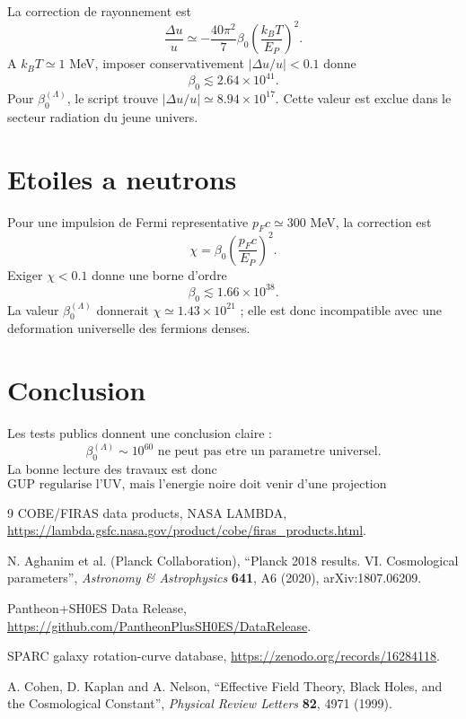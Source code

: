 \documentclass[11pt,a4paper]{article}
\begin{document}
La correction de rayonnement est
\begin{equation}
\frac{\Delta u}{u}
\simeq
-\frac{40\pi^2}{7}\beta_0\left(\frac{k_BT}{E_P}\right)^2.
\end{equation}
A $k_BT\simeq1$ MeV, imposer conservativement
$|\Delta u/u|<0.1$ donne
\begin{equation}
\beta_0\lesssim 2.64\times10^{41}.
\end{equation}
Pour $\beta_0^{(\Lambda)}$, le script trouve
$|\Delta u/u|\simeq8.94\times10^{17}$. Cette valeur est exclue dans le secteur
radiation du jeune univers.

\section{Etoiles a neutrons}

Pour une impulsion de Fermi representative $p_Fc\simeq300$ MeV, la correction
est
\begin{equation}
\chi=\beta_0\left(\frac{p_Fc}{E_P}\right)^2.
\end{equation}
Exiger $\chi<0.1$ donne une borne d'ordre
\begin{equation}
\beta_0\lesssim1.66\times10^{38}.
\end{equation}
La valeur $\beta_0^{(\Lambda)}$ donnerait $\chi\simeq1.43\times10^{21}$ ; elle
est donc incompatible avec une deformation universelle des fermions denses.

\section{Conclusion}

Les tests publics donnent une conclusion claire :
\begin{equation}
\boxed{
\beta_0^{(\Lambda)}\sim10^{60}
\text{ ne peut pas etre un parametre universel.}
}
\end{equation}
La bonne lecture des travaux est donc
\begin{equation}
\boxed{
\text{GUP regularise l'UV, mais l'energie noire doit venir d'une projection IR/holographique.}
}
\end{equation}

\begin{thebibliography}{9}
COBE/FIRAS data products, NASA LAMBDA,
\url{https://lambda.gsfc.nasa.gov/product/cobe/firas_products.html}.

N. Aghanim et al. (Planck Collaboration),
``Planck 2018 results. VI. Cosmological parameters'',
\emph{Astronomy \& Astrophysics} \textbf{641}, A6 (2020),
arXiv:1807.06209.

Pantheon+SH0ES Data Release,
\url{https://github.com/PantheonPlusSH0ES/DataRelease}.

SPARC galaxy rotation-curve database,
\url{https://zenodo.org/records/16284118}.

A. Cohen, D. Kaplan and A. Nelson,
``Effective Field Theory, Black Holes, and the Cosmological Constant'',
\emph{Physical Review Letters} \textbf{82}, 4971 (1999).
\end{thebibliography}
\end{document}
